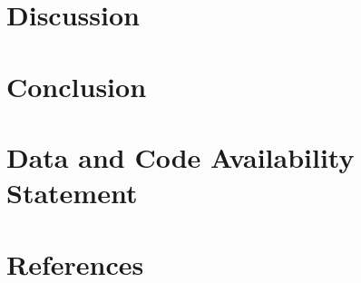 \documentclass[11pt, titlepage]{article}
\begin{document}
\section{Discussion}
\label{discussion}


\section{Conclusion}
\label{conclusion}


\vfill
{\normalsize\section*{Data and Code Availability Statement}}



\newpage
\section*{References}
\label{references}
\printbibliography[heading=none]

\newpage

\end{document}
